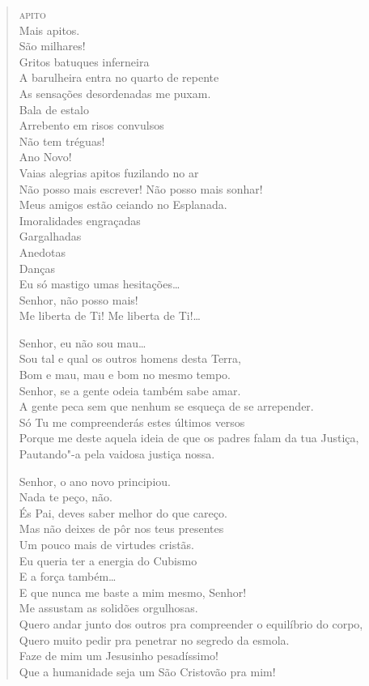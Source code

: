 \begin{verse}
\qquad\qquad \textsc{apito}\\
\qquad Mais apitos.\\
\qquad São milhares!\\
Gritos batuques inferneira\\
A barulheira entra no quarto de repente\\
As sensações desordenadas me puxam.\\
\qquad\qquad\qquad Bala de estalo\\
\qquad\qquad Arrebento em risos convulsos\\
\qquad\qquad Não tem tréguas!\\
\qquad Ano Novo!\\
Vaias alegrias apitos fuzilando no ar\\
Não posso mais escrever! Não posso mais sonhar!\\
Meus amigos estão ceiando no Esplanada.\\
\qquad\qquad Imoralidades engraçadas\\
\qquad\qquad Gargalhadas\\
\qquad\qquad Anedotas\\
\qquad\qquad Danças\\
Eu só mastigo umas hesitações\ldots{}\\
Senhor, não posso mais!\\
Me liberta de Ti! Me liberta de Ti!\ldots{}

Senhor, eu não sou mau\ldots{}\\
Sou tal e qual os outros homens desta Terra,\\
Bom e mau, mau e bom no mesmo tempo.\\
Senhor, se a gente odeia também sabe amar.\\
A gente peca sem que nenhum se esqueça de se arrepender.\\
Só Tu me compreenderás estes últimos versos\\
Porque me deste aquela ideia de que os padres falam da tua Justiça,\\
Pautando"-a pela vaidosa justiça nossa.

Senhor, o ano novo principiou.\\
Nada te peço, não.\\
És Pai, deves saber melhor do que careço.\\
Mas não deixes de pôr nos teus presentes\\
Um pouco mais de virtudes cristãs.\\
Eu queria ter a energia do Cubismo\\
E a força também\ldots{}\\
E que nunca me baste a mim mesmo, Senhor!\\
Me assustam as solidões orgulhosas.\\
Quero andar junto dos outros pra compreender o equilíbrio do corpo,\\
Quero muito pedir pra penetrar no segredo da esmola.\\
Faze de mim um Jesusinho pesadíssimo!\\
Que a humanidade seja um São Cristovão pra mim!


\end{verse}
